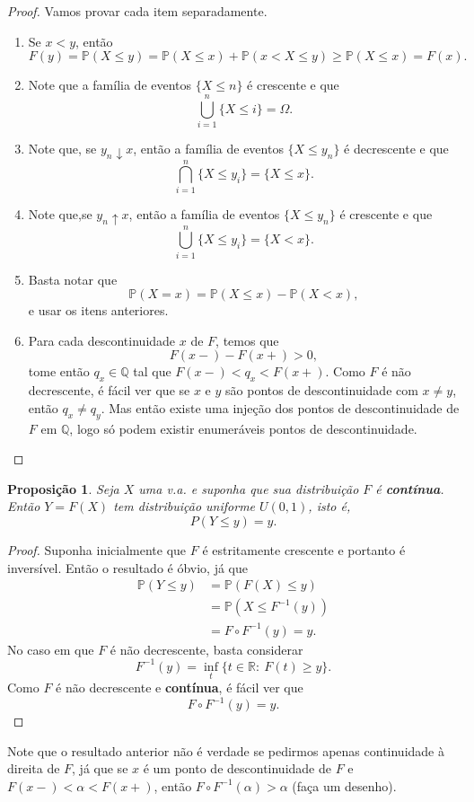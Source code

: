 \documentclass[12pt,a4paper,oneside]{book}
\newtheorem{proposition}[theorem]{Proposi\c{c}\~ao}
\theoremstyle{definition}
\theoremstyle{remark}
\numberwithin{equation}{section}
\newcommand{\R}{\mathbb{R}}
\newcommand{\pr}{\mathbb{P}}
\begin{document}
\begin{proof}
Vamos provar cada item separadamente.
\begin{enumerate}
\item Se $x< y$, então
$$F(y)= \pr(X\leq y) = \pr(X\leq x) + \pr(x < X\leq y )\geq \pr(X\leq x)= F(x). $$
\item Note que  a família de eventos
$\{X\leq n\}$
é crescente e que 
$$\bigcup_{i=1}^n \{X\leq i\} = \Omega. $$
\item Note que, se $y_n\downarrow x$, então a família de eventos $\{X\leq y_n\}$ é decrescente e que 
$$\bigcap_{i=1}^n\{X\leq y_i\}= \{X\leq x\}. $$
\item Note que,se $y_n\uparrow x$, então a família de eventos $\{X\leq y_n\}$ é crescente e que 
$$\bigcup_{i=1}^n\{X\leq y_i\}= \{X< x\}. $$ 
\item Basta notar que
$$\pr(X=x) = \pr(X\leq x)- \pr(X<x), $$
e usar os itens anteriores.
\item Para cada descontinuidade $x$ de $F$, temos que
$$F(x-)-F(x+)>0, $$
tome então $q_x\in \mathbb{Q}$ tal que  $F(x-)<q_x<F(x+)$. Como $F$ é não decrescente, é fácil ver que se $x$ e $y$ são pontos de descontinuidade com $x\neq y$, então $q_x\neq q_y$. Mas então existe uma injeção dos pontos de descontinuidade de $F$ em $\mathbb{Q}$, logo só podem existir enumeráveis pontos de descontinuidade.
\end{enumerate}
\end{proof}

\begin{proposition}
Seja $X$ uma v.a. e suponha que sua distribuição $F$ é \textbf{contínua}. Então $Y= F(X)$ tem distribuição uniforme $U(0,1)$, isto é, 
$$P(Y\leq y) = y. $$
\end{proposition}
\begin{proof}
Suponha inicialmente que $F$ é estritamente crescente e portanto é inversível. Então o resultado é óbvio, já que
\begin{align*}
\pr(Y\leq y) &= \pr(F(X)\leq y)\\
&= \pr(X\leq F^{-1}(y))\\
&= F\circ F^{-1}(y) = y.
\end{align*}
No caso em que $F$ é não decrescente, basta considerar 
$$F^{-1}(y) = \inf_t \{ t\in \R:\ F(t) \geq  y  \}. $$
Como $F$ é não decrescente e \textbf{contínua}, é fácil ver que
$$F\circ F^{-1}(y) = y. $$
\end{proof}

\begin{tcolorbox}[colback = yellow!60]
Note que o resultado anterior não é verdade se pedirmos apenas continuidade à direita de $F$, já que se $x$ é um ponto de descontinuidade de $F$ e  $F(x-)<\alpha<F(x+)$, então $F\circ F^{-1}(\alpha)> \alpha$ (faça um desenho).
\end{tcolorbox}
\end{document}
